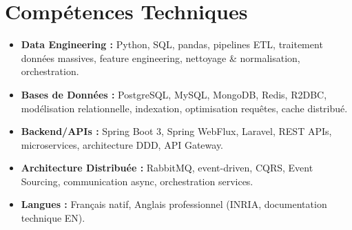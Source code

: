 \documentclass[a4paper,11pt]{article}
\begin{document}
\section{Comp\'etences Techniques}
\begin{itemize}[leftmargin=*, label=\tiny$\bullet$, nosep]
    \item \textbf{Data Engineering :} Python, SQL, pandas, pipelines ETL, traitement donn\'ees massives, feature engineering, nettoyage \& normalisation, orchestration.
    \item \textbf{Bases de Donn\'ees :} PostgreSQL, MySQL, MongoDB, Redis, R2DBC, mod\'elisation relationnelle, indexation, optimisation requ\^etes, cache distribu\'e.
    \item \textbf{Backend/APIs :} Spring Boot 3, Spring WebFlux, Laravel, REST APIs, microservices, architecture DDD, API Gateway.
    \item \textbf{Architecture Distribu\'ee :} RabbitMQ, event-driven, CQRS, Event Sourcing, communication async, orchestration services.
    \item \textbf{Langues :} Fran\c{c}ais natif, Anglais professionnel (INRIA, documentation technique EN).
\end{itemize}
\end{document}
